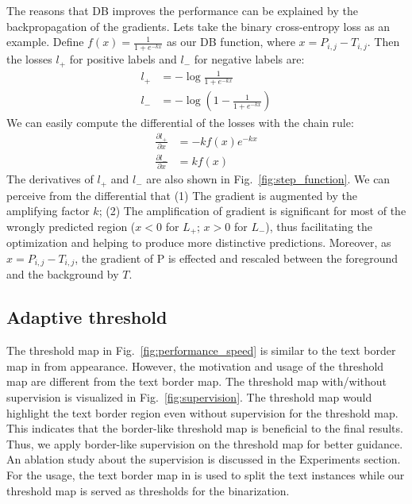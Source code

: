 \documentclass[letterpaper]{article} %
\begin{document}
The reasons that DB improves the performance can be explained by the backpropagation of the gradients. Lets take the binary cross-entropy loss as an example. Define $f(x) = \frac {1} {1 + e^{-kx}}$ as our DB function, where $x = P_{i, j} - T_{i, j}$. Then the losses $l_{+}$ for positive labels and $l_{-}$ for negative labels are:
\begin{equation}
    \begin{split}
    l_{+} &= - \log \frac {1}{1+e^{-kx}} \\
    l_{-} &= - \log ( 1 - \frac {1}{1+e^{-kx}} )
    \end{split}
\end{equation}
We can easily compute the differential of the losses with the chain rule:
\begin{equation}
    \begin{split}
        \frac {\partial l_{+}}{\partial x} &= -kf(x)e^{-kx}\\
        \frac {\partial l_{-}}{\partial x} &= kf(x)
    \end{split}
\end{equation}
The derivatives of $l_{+}$ and $l_{-}$ are also shown in Fig.~\ref{fig:step_function}.
We can perceive from the differential that (1) The gradient is augmented by the amplifying factor $k$; (2) The amplification of gradient is significant for most of the wrongly predicted region ($x<0$ for $L_{+}$; $x>0$ for $L_{-}$), thus facilitating the optimization and helping to produce more distinctive predictions. Moreover, as $x = P_{i, j} - T_{i, j}$, the gradient of P is effected and rescaled between the foreground and the background by $T$.


\subsection{Adaptive threshold}
The threshold map in Fig.~\ref{fig:performance_speed} is similar to the text border map in \cite{xue2018accurate} from appearance. However, the motivation and usage of the threshold map are different from the text border map. The threshold map with/without supervision is visualized in Fig.~\ref{fig:supervision}. 
The threshold map would highlight the text border region even without supervision for the threshold map. This indicates that the border-like threshold map is beneficial to the final results. Thus, we apply border-like supervision on the threshold map for better guidance. An ablation study about the supervision is discussed in the Experiments section.
For the usage, the text border map in \cite{xue2018accurate} is used to split the text instances while our threshold map is served as thresholds for the binarization. 
\end{document}
